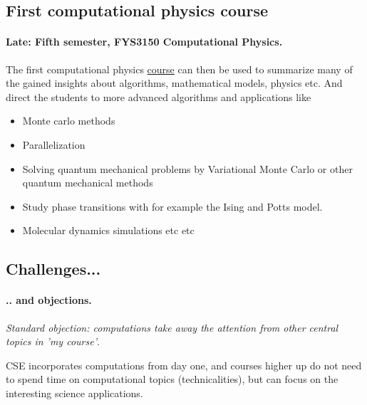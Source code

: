 \documentclass[%
twoside,                 %
final,                   %
10pt]{article}
\begin{document}
\noindent



\subsection*{First computational physics course}

\paragraph{Late: Fifth semester, FYS3150 Computational Physics.}

The first computational physics \href{{http://www.uio.no/studier/emner/matnat/fys/FYS3150/h14/}}{course} can then be used to summarize many of the gained insights about algorithms, mathematical models, physics etc. And direct the students to more advanced algorithms and applications like

\begin{itemize}
\item Monte carlo methods

\item Parallelization

\item Solving quantum mechanical problems by Variational Monte Carlo  or other quantum mechanical methods

\item Study phase transitions with for example the Ising and Potts model.

\item Molecular dynamics simulations etc etc 
\end{itemize}

\noindent




\subsection*{Challenges...}

\paragraph{.. and objections.}

\emph{Standard objection: computations take away the attention from other central topics in 'my course'}. 

CSE incorporates computations from day one, and courses higher up do not need to
spend time on computational topics  (technicalities), but can focus on the interesting
science applications.
\end{document}
